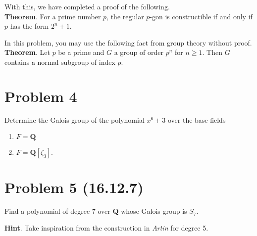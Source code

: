 \documentclass{amsart}
\begin{document}
With this, we have completed a proof of the following.\\
\textbf{Theorem}. For a prime number \(p\), the regular \(p\)-gon is constructible if and only if \(p\) has the form \(2^n+1\).

In this problem, you may use the following fact from group theory without proof. \\
\textbf{Theorem}. Let \(p\) be a prime and \(G\) a group of order \(p^{n}\) for \(n \geq 1\).  Then \(G\) contains a normal subgroup of index \(p\).
\section{Problem 4}
\label{sec:org9cdbcca}

Determine the Galois group of the polynomial \(x^6+3\) over the base fields
\begin{enumerate}
\item \(F = \mathbf{Q}\)
\item \(F = \mathbf{Q}[\zeta_3]\).
\end{enumerate}
\section{Problem 5 (16.12.7)}
\label{sec:org4b001ce}

Find a polynomial of degree \(7\) over \(\mathbf{Q}\) whose Galois group is \(S_7\).

\textbf{Hint}. Take inspiration from the construction in \emph{Artin} for degree 5.
\end{document}
